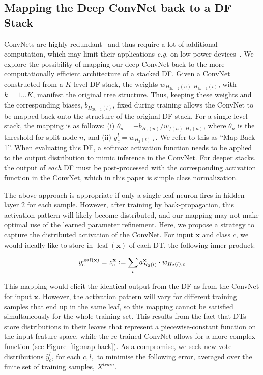 \documentclass[twocolumn]{svjour3}
\DeclareMathOperator{\leaf}{leaf}
\begin{document}
%
\subsection{Mapping the Deep ConvNet back to a DF Stack}
\label{subsec:back-map}

ConvNets are highly redundant~\cite{Liu:sparseCNN} and thus require a lot of additional computation, which may limit their applications \textit{e.g.} on low power devices~\cite{GolodetzSVVCAPK15, Massiceti:2016wg}.
We explore the possibility of mapping our deep ConvNet back to the more computationally efficient architecture of a stacked DF.
Given a ConvNet constructed from a $K$-level DF stack, the weights $w_{H_{3k-2}(n),H_{3k-1}(l)}$, with $k=1...K$, manifest the original tree structure.
Thus, keeping these weights and the corresponding biases, $b_{H_{3k-1}(l)}$, fixed during training allows the ConvNet to be mapped back onto the structure of the original DF stack.
For a single level stack, the mapping is as follows: (i) $\theta_n = -b_{H_1(n)}/w_{f(n),H_1(n)}$, where $\theta_n$ is the threshold for split node $n$, and (ii) $y^l_c = w_{H_2(l),c}$.
We refer to this as ``Map Back 1''.
When evaluating this DF, a softmax activation function needs to be applied to the output distribution to mimic inference in the ConvNet.
For deeper stacks, the output of \emph{each} DF must be post-processed with the corresponding activation function in the ConvNet, which in this paper is simple class normalization.

%
The above approach is appropriate if only a single leaf neuron fires in hidden layer $2$ for each sample. However, after training by back-propagation, this activation pattern will likely become distributed, and our mapping may not make optimal use of the learned parameter refinement.
Here, we propose a strategy to capture the distributed activation of the ConvNet.
For input $\mathbf{x}$ and class $c$, we would ideally like to store in $\leaf(\mathbf{x})$ of each DT, the following inner product:

\begin{equation}
y^{\leaf(\mathbf{x})}_c = z^{\mathbf{x}}_c := \nobreak{\sum_{l} a^\mathbf{x}_{H_2(l)} \cdot w_{H_2(l),c}}
\end{equation}

This mapping would elicit the identical output from the DF as from the ConvNet for input $\mathbf{x}$.
However, the activation pattern will vary for different training samples that end up in the same leaf, so this mapping cannot be satisfied simultaneously for the whole training set.
This results from the fact that DTs store distributions in their leaves that represent a piecewise-constant function on the input feature space, while the re-trained ConvNet allows for a more complex function
(see Figure~\ref{fig:map-back}).
As a compromise, we seek new vote distributions $\hat{y}^l_c$, for each $c,l,$ to minimise the following error, averaged over the finite set of training samples, $X^{train}$.
\end{document}
